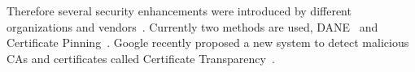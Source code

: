 Therefore several security enhancements were introduced by different
organizations and vendors~\cite{tschofenig-webpki}. Currently two
methods are used, DANE~\cite{rfc6698} and Certificate
Pinning~\cite{draft-ietf-websec-key-pinning}. Google recently proposed
a new system to detect malicious CAs and certificates  called Certificate 
Transparency~\cite{certtransparency}.









